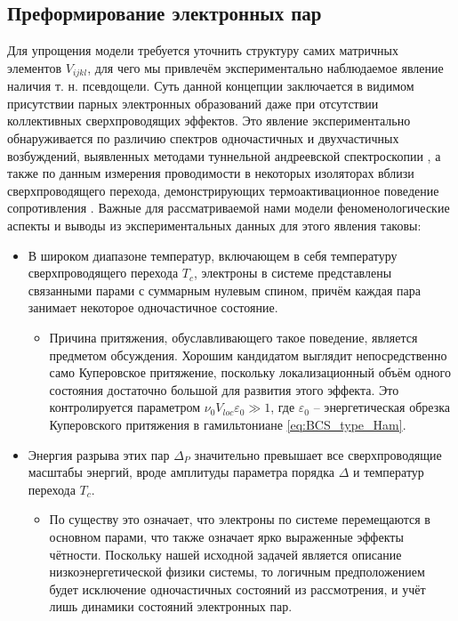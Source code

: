 \subsection{Преформирование электронных пар}
Для упрощения модели требуется уточнить структуру самих матричных элементов $V_{ijkl}$, для чего мы привлечём экспериментально наблюдаемое явление наличия т. н. псевдощели. Суть данной концепции заключается в видимом присутствии парных электронных образований даже при отсутствии коллективных сверхпроводящих эффектов. Это явление экспериментально обнаруживается по различию спектров одночастичных и двухчастичных возбуждений, выявленных методами туннельной андреевской спектроскопии \cite{Dubouchet_et_al_2018}, а также по данным измерения проводимости в некоторых изоляторах вблизи сверхпроводящего перехода, демонстрирующих термоактивационное поведение сопротивления \cite{Shahar_Ovadyahu_1992}. Важные для рассматриваемой нами модели феноменологические аспекты и выводы из экспериментальных данных для этого явления таковы:
\begin{itemize}
	\item В широком диапазоне температур, включающем в себя температуру сверхпроводящего перехода $T_c$, электроны в системе представлены связанными парами с суммарным нулевым спином, причём каждая пара занимает некоторое одночастичное состояние.
	\begin{itemize}
		\item Причина притяжения, обуславливающего такое поведение, является предметом обсуждения. Хорошим кандидатом выглядит непосредственно само Куперовское притяжение, поскольку локализационный объём одного состояния достаточно большой для развития этого эффекта. Это контролируется параметром $\nu_0 V_{loc} \varepsilon_0 \gg 1$, где $\varepsilon_0$ -- энергетическая обрезка Куперовского притяжения в гамильтониане \eqref{eq:BCS_type_Ham}.
	\end{itemize}
	
	\item Энергия разрыва этих пар $\Delta_P$ значительно превышает все сверхпроводящие масштабы энергий, вроде амплитуды параметра порядка $\Delta$ и температур перехода $T_c$. 
	\begin{itemize}
		\item По существу это означает, что электроны по системе перемещаются в основном парами, что также означает ярко выраженные эффекты чётности. Поскольку нашей исходной задачей является описание низкоэнергетической физики системы, то логичным предположением будет исключение одночастичных состояний из рассмотрения, и учёт лишь динамики состояний электронных пар.
	\end{itemize}
\end{itemize} 
